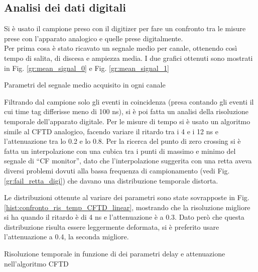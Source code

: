 \subsection{Analisi dei dati digitali}
Si è usato il campione preso con il digitizer per fare un confronto tra le misure prese con l'apparato analogico e quelle prese digitalmente.\\
Per prima cosa è stato ricavato un segnale medio per canale, ottenendo così tempo di salita, di discesa e ampiezza media. I due grafici ottenuti sono mostrati in Fig. \ref{gr:mean_signal_0} e Fig. \ref{gr:mean_signal_1}




\begin{tabella}[h]
	\centering
	
	\caption{Parametri del segnale medio acquisito in ogni canale}
	\label{tab:calibrazione_iniziali_digit}
\end{tabella}

Filtrando dal campione solo gli eventi in coincidenza (presa contando gli eventi il cui time tag differisse meno di 100 ns), si è poi fatta un analisi della risoluzione temporale dell'apparato digitale. Per le misure di tempo si è usato un algoritmo simile al CFTD analogico, facendo variare il ritardo tra i 4 e i 12 ns e l'attenuazione tra lo 0.2 e lo 0.8. Per la ricerca del punto di zero crossing si è fatta un interpolazione con una cubica tra i punti di massimo e minimo del segnale di ``CF monitor'', dato che l'interpolazione suggerita con una retta aveva diversi problemi dovuti alla bassa frequenza di campionamento (vedi Fig. \ref{gr:fail_retta_digi}) che davano una distribuzione temporale distorta.



Le distribuzioni ottenute al variare dei parametri sono state sovrapposte in Fig. \ref{hist:confronto_ris_temp_CFTD_linear}, mostrando che la risoluzione migliore si ha quando il ritardo è di 4 ns e l'attenuazione è a 0.3. Dato però che questa distribuzione risulta essere leggermente deformata, si è preferito usare l'attenuazione a 0.4, la seconda migliore.



\begin{tabella}[h]
	\centering
	
	\caption{Risoluzione temporale in funzione di dei parametri delay e attenuazione nell'algoritmo CFTD}
	\label{tab:cftd_fwhm_digi}
\end{tabella}

